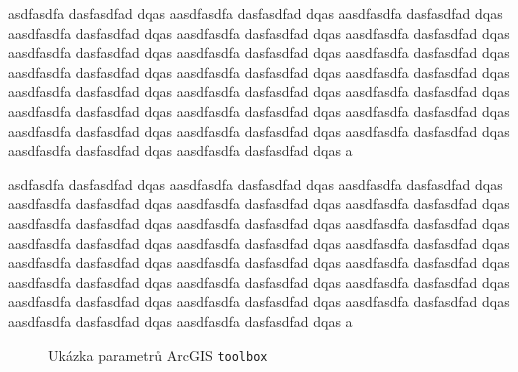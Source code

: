 \documentclass[a4paper,10pt]{article}
\begin{document}
  asdfasdfa dasfasdfad dqas aasdfasdfa dasfasdfad dqas aasdfasdfa dasfasdfad dqas aasdfasdfa dasfasdfad dqas aasdfasdfa dasfasdfad dqas aasdfasdfa dasfasdfad dqas aasdfasdfa dasfasdfad dqas aasdfasdfa dasfasdfad dqas aasdfasdfa dasfasdfad dqas aasdfasdfa dasfasdfad dqas aasdfasdfa dasfasdfad dqas aasdfasdfa dasfasdfad dqas aasdfasdfa dasfasdfad dqas aasdfasdfa dasfasdfad dqas aasdfasdfa dasfasdfad dqas aasdfasdfa dasfasdfad dqas aasdfasdfa dasfasdfad dqas aasdfasdfa dasfasdfad dqas aasdfasdfa dasfasdfad dqas aasdfasdfa dasfasdfad dqas aasdfasdfa dasfasdfad dqas aasdfasdfa dasfasdfad dqas aasdfasdfa dasfasdfad dqas a
  
  asdfasdfa dasfasdfad dqas aasdfasdfa dasfasdfad dqas aasdfasdfa dasfasdfad dqas aasdfasdfa dasfasdfad dqas aasdfasdfa dasfasdfad dqas aasdfasdfa dasfasdfad dqas aasdfasdfa dasfasdfad dqas aasdfasdfa dasfasdfad dqas aasdfasdfa dasfasdfad dqas aasdfasdfa dasfasdfad dqas aasdfasdfa dasfasdfad dqas aasdfasdfa dasfasdfad dqas aasdfasdfa dasfasdfad dqas aasdfasdfa dasfasdfad dqas aasdfasdfa dasfasdfad dqas aasdfasdfa dasfasdfad dqas aasdfasdfa dasfasdfad dqas aasdfasdfa dasfasdfad dqas aasdfasdfa dasfasdfad dqas aasdfasdfa dasfasdfad dqas aasdfasdfa dasfasdfad dqas aasdfasdfa dasfasdfad dqas aasdfasdfa dasfasdfad dqas a 
  \begin{figure}
    \caption{Ukázka parametrů ArcGIS {\tt toolbox}}
    \label{fig:toolbox}
  \end{figure} 
\end{document}
